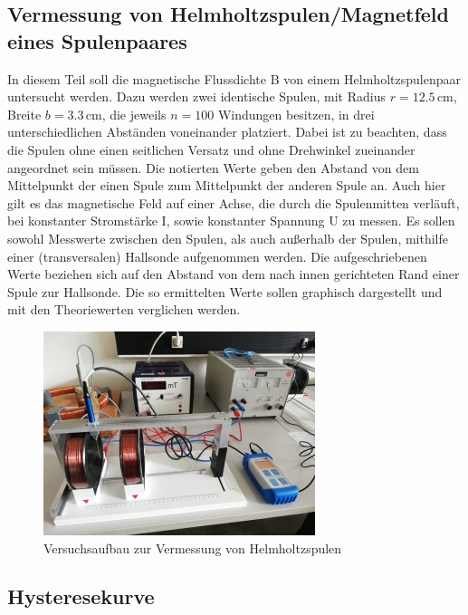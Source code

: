\subsection{Vermessung von Helmholtzspulen/Magnetfeld eines Spulenpaares}

In diesem Teil soll die magnetische Flussdichte B von einem Helmholtzspulenpaar untersucht werden.
Dazu werden zwei identische Spulen, mit Radius $r = 12.5\, \si{\cm}$, Breite $b = 3.3\, \si{\centi\meter}$, die
jeweils $n = 100$ Windungen besitzen, in drei unterschiedlichen Abständen voneinander platziert. Dabei ist zu beachten,
dass die Spulen ohne einen seitlichen Versatz und ohne Drehwinkel zueinander angeordnet sein müssen.
Die notierten Werte geben den Abstand von dem Mittelpunkt der einen Spule zum Mittelpunkt der anderen Spule an. 
Auch hier gilt es das magnetische Feld auf einer Achse, die durch die Spulenmitten verläuft, bei konstanter
Stromstärke I, sowie konstanter Spannung U zu messen. Es sollen sowohl Messwerte zwischen den Spulen, als auch 
außerhalb der Spulen, mithilfe einer (transversalen) Hallsonde aufgenommen werden. Die aufgeschriebenen 
Werte beziehen sich auf den Abstand von dem nach innen gerichteten Rand einer Spule zur Hallsonde.
Die so ermittelten Werte sollen graphisch dargestellt und mit den Theoriewerten verglichen werden.

\begin{figure}[H]
    \centering
    \includegraphics{content/Helmholtzspule.jpg}
    \caption{Versuchsaufbau zur Vermessung von Helmholtzspulen}
    \label{Helmholtzspulen}
\end{figure}

\subsection{Hysteresekurve}

